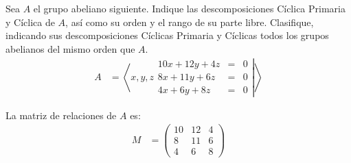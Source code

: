 \documentclass[12pt]{article}
\begin{document}
    \begin{ejercicio}
        Sea $A$ el grupo abeliano siguiente. Indique las descomposiciones Cíclica Primaria y Cíclica de $A$, así como su orden y el rango de su parte libre. Clasifique, indicando sus descomposiciones Cíclicas Primaria y Cíclicas todos los grupos abelianos del mismo orden que $A$.
        \begin{align*}
            A & = \left\langle x, y, z\left.\begin{array}{rcl}
                10x + 12y + 4z & = & 0 \\
                8x + 11y + 6z & = & 0 \\
                4x + 6y + 8z & = & 0
            \end{array}\right|\right\rangle
        \end{align*}

        La matriz de relaciones de $A$ es:
        \begin{align*}
            M & = \begin{pmatrix}
                10 & 12 & 4 \\
                8 & 11 & 6 \\
                4 & 6 & 8
            \end{pmatrix}
        \end{align*}


\end{ejercicio}
\end{document}
